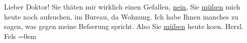 \begin{ledgroupsized}[t]{13cm}
           \pstart
           Lieber Doktor! Sie thäten mir wirklich einen Gefallen, \uline{nein}, Sie \uline{müſsen} mich heute noch aufsuchen,
               im Bureau, da{\geminationn} Wohnung. Ich habe Ihnen manches zu sagen,
               was gegen meine Beſserung spricht. Also Sie \uline{müſsen}
               heute ko{\geminationm}en.\pend
           \pstart
           Herzl.{\\[\baselineskip]}\spacefill\mbox{Fels}\pend
           \leftskip=0em{}\endnumbering{}\end{ledgroupsized}  \newcommand{\dateiname}{L00153}\newcommand{\titel}{Friedrich M. Fels an Arthur Schnitzler, [1. 1. 1893?]}\newcommand{\editorInnen}{Martin Anton Müller und Gerd-Hermann Susen}
      